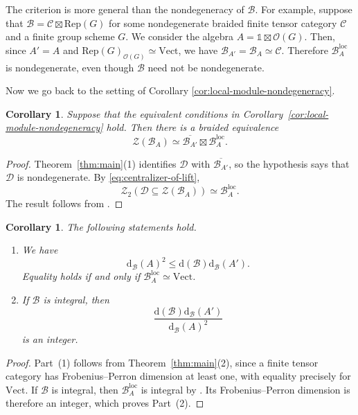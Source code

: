 \documentclass[11pt,reqno]{amsart}
\numberwithin{equation}{section}
\theoremstyle{plain}
\newtheorem{corollary}[thmctr]{Corollary}
\theoremstyle{definition}
\theoremstyle{remark}
\newcommand{\unit}{\mathds{1}}
\newcommand{\B}{\mathcal{B}}
\newcommand{\C}{\mathcal{C}}
\newcommand{\D}{\mathcal{D}}
\newcommand{\Z}{\mathcal{Z}}
\newcommand{\loc}{\mathrm{loc}}
\newcommand{\FP}{\mathrm{d}}
\newcommand{\Vect}{\mathrm{Vect}}
\begin{document}
The criterion is more general than the nondegeneracy of $\B$. 
For example, suppose that $\B = \C \boxtimes \mathrm{Rep}(G)$ for some nondegenerate braided finite tensor category $\C$ and a finite group scheme $G$. We consider the algebra $A = \unit \boxtimes \mathcal{O}(G)$. Then, since $A'=A$ and $\mathrm{Rep}(G)_{\mathcal{O}(G)} \simeq \Vect$, we have $\B_{A'} = \B_A \simeq \C$. Therefore $\B_A^{\loc}$ is nondegenerate, even though $\B$ need not be nondegenerate.

Now we go back to the setting of Corollary \ref{cor:local-module-nondegeneracy}.

\begin{corollary}\label{cor:local-module-factorization}
Suppose that the equivalent conditions in
Corollary~\ref{cor:local-module-nondegeneracy} hold. Then there is a braided
equivalence
\[
  \Z(\B_A)
  \simeq
  \overline{\B_{A'}}\boxtimes\B_A^{\loc}.
\]
\end{corollary}

\begin{proof}
Theorem~\ref{thm:main}(1) identifies $\D$ with
$\overline{\B_{A'}}$, so the hypothesis says that $\D$ is nondegenerate.
By \eqref{eq:centralizer-of-lift},
\[
  \Z_2(\D\subseteq\Z(\B_A))\simeq\B_A^{\loc}.
\]
The result follows from
\cite[Theorem~4.17]{laugwitz2022relative}.
\end{proof}

\begin{corollary}\label{cor:local-module-numerical-consequences}
The following statements hold.
\begin{enumerate}
  \item We have
  \[
    \FP_{\B}(A)^2
    \leq
    \FP(\B)\FP_{\B}(A').
  \]
  Equality holds if and only if $\B_A^{\loc}\simeq\Vect$.
  \item If $\B$ is integral, then
  \[
    \frac{\FP(\B)\FP_{\B}(A')}{\FP_{\B}(A)^2}
  \]
  is an integer.
\end{enumerate}
\end{corollary}

\begin{proof}
Part~(1) follows from Theorem~\ref{thm:main}(2), since a finite tensor
category has Frobenius--Perron dimension at least one, with equality precisely
for $\Vect$. If $\B$ is integral, then $\B_A^{\loc}$ is integral by
\cite[Lemma~5.16]{shimizu2026commutative}. Its Frobenius--Perron dimension is
therefore an integer, which proves Part~(2).
\end{proof}
\end{document}
